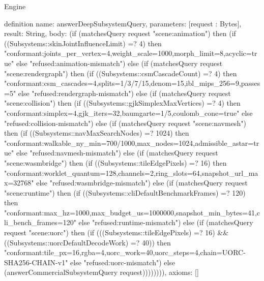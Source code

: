 \begin{lexlean}{Engine}
\begin{semanticmodule}
definition{
  name: answerDeepSubsystemQuery,
  parameters: [request : Bytes],
  result: String,
  body: (if (matchesQuery request "scene:animation") then (if ((Subsystems::skinJointInfluenceLimit) =? 4) then "conformant:joints_per_vertex=4,weight_scale=1000,morph_limit=8,acyclic=true" else "refused:animation-mismatch") else (if (matchesQuery request "scene:rendergraph") then (if ((Subsystems::csmCascadeCount) =? 4) then "conformant:csm_cascades=4,splits=1/3/7/15,denom=15,ibl_mips_256=9,passes=5" else "refused:rendergraph-mismatch") else (if (matchesQuery request "scene:collision") then (if ((Subsystems::gjkSimplexMaxVertices) =? 4) then "conformant:simplex=4,gjk_iters=32,baumgarte=1/5,coulomb_cone=true" else "refused:collision-mismatch") else (if (matchesQuery request "scene:navmesh") then (if ((Subsystems::navMaxSearchNodes) =? 1024) then "conformant:walkable_ny_min=700/1000,max_nodes=1024,admissible_astar=true" else "refused:navmesh-mismatch") else (if (matchesQuery request "scene:wasmbridge") then (if ((Subsystems::tileEdgePixels) =? 16) then "conformant:worklet_quantum=128,channels=2,ring_slots=64,snapshot_url_max=32768" else "refused:wasmbridge-mismatch") else (if (matchesQuery request "scene:runtime") then (if ((Subsystems::cliDefaultBenchmarkFrames) =? 120) then "conformant:max_hz=1000,max_budget_us=1000000,snapshot_min_bytes=41,cli_bench_frames=120" else "refused:runtime-mismatch") else (if (matchesQuery request "scene:uorc") then (if (((Subsystems::tileEdgePixels) =? 16) && ((Subsystems::uorcDefaultDecodeWork) =? 40)) then "conformant:tile_px=16,rgba=4,uorc_work=40,uorc_steps=4,chain=UORC-SHA256-CHAIN-v1" else "refused:uorc-mismatch") else (answerCommercialSubsystemQuery request)))))))),
  axioms: []
}


\end{semanticmodule}
\end{lexlean}
